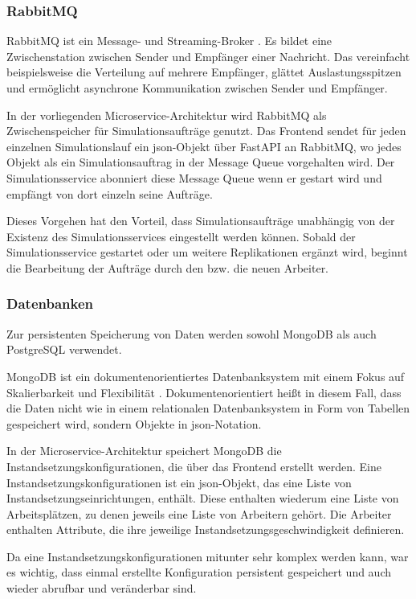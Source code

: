 \documentclass[11pt,a4paper]{article}
\begin{document}
\subsubsection{RabbitMQ}
\label{sec:RabbitMQ}
RabbitMQ ist ein Message- und Streaming-Broker \cite{RabbitMQ}. Es bildet eine Zwischenstation
zwischen Sender und Empfänger einer Nachricht. Das vereinfacht beispielsweise die Verteilung auf 
mehrere Empfänger, glättet Auslastungsspitzen und ermöglicht asynchrone Kommunikation zwischen
Sender und Empfänger. 

In der vorliegenden Microservice-Architektur wird RabbitMQ als Zwischenspeicher für
Simulationsaufträge genutzt. Das Frontend sendet für jeden einzelnen Simulationslauf
ein json-Objekt über FastAPI an RabbitMQ, wo jedes Objekt als ein Simulationsauftrag
in der Message Queue vorgehalten wird. Der Simulationsservice abonniert diese Message Queue
wenn er gestart wird und empfängt von dort einzeln seine Aufträge.

Dieses Vorgehen hat den Vorteil, dass Simulationsaufträge unabhängig von der Existenz
des Simulationsservices eingestellt werden können. Sobald der Simulationsservice gestartet
oder um weitere Replikationen ergänzt wird, beginnt die Bearbeitung der Aufträge durch den
bzw. die neuen Arbeiter.

\subsubsection{Datenbanken}
\label{sec:Datenbanken}
Zur persistenten Speicherung von Daten werden sowohl MongoDB als auch PostgreSQL verwendet.

MongoDB ist ein dokumentenorientiertes Datenbanksystem mit einem Fokus auf Skalierbarkeit und Flexibilität \cite{Bradshaw_2010}.
Dokumentenorientiert heißt in diesem Fall, dass die Daten nicht wie in einem relationalen
Datenbanksystem in Form von Tabellen gespeichert wird, sondern Objekte in json-Notation.

In der Microservice-Architektur speichert MongoDB die Instandsetzungskonfigurationen,
die über das Frontend erstellt werden.
Eine Instandsetzungskonfigurationen ist ein json-Objekt, das eine Liste von Instandsetzungseinrichtungen,
enthält. Diese enthalten wiederum eine Liste von Arbeitsplätzen, zu denen jeweils eine Liste
von Arbeitern gehört. 
Die Arbeiter enthalten Attribute, die ihre jeweilige Instandsetzungsgeschwindigkeit definieren.

Da eine Instandsetzungskonfigurationen mitunter sehr komplex werden kann, war es wichtig,
dass einmal erstellte Konfiguration persistent gespeichert und auch wieder abrufbar und veränderbar sind.
\end{document}
